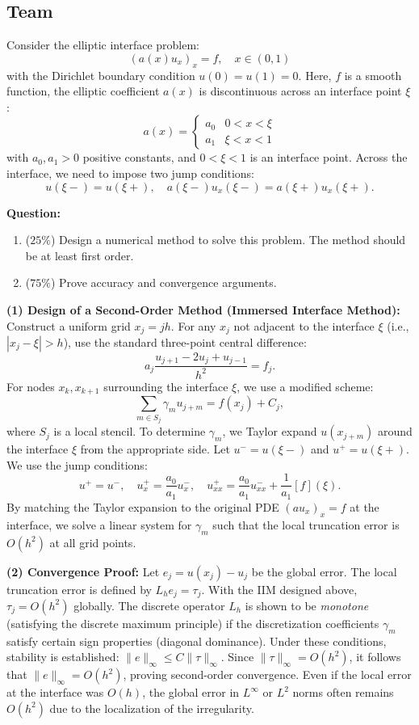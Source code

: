 \subsection{Team}

\begin{exercise}
\label{applied:2015:6}
Consider the elliptic interface problem:
\[
(a(x)u_{x})_{x}=f,\quad x\in(0,1)
\]
with the Dirichlet boundary condition $u(0) = u(1) = 0$. Here, $f$ is a smooth function, the elliptic coefficient $a(x)$ is discontinuous across an interface point $\xi$:
\[
a(x)=\begin{cases}a_{0}&0<x<\xi\\ a_{1}&\xi<x<1\end{cases}
\]
with $a_{0},a_{1}>0$ positive constants, and $0<\xi<1$ is an interface point. Across the interface, we need to impose two jump conditions:
\[
u(\xi-)=u(\xi+),\quad a(\xi-)u_{x}(\xi-)=a(\xi+)u_{x}(\xi+).
\]

\textbf{Question:}
\begin{enumerate}
\item[(1)] ($25\%$) Design a numerical method to solve this problem. The method should be at least first order.
\item[(2)] ($75\%$) Prove accuracy and convergence arguments.
\end{enumerate}
\end{exercise}

\begin{solution}
\textbf{(1) Design of a Second-Order Method (Immersed Interface Method):}
Construct a uniform grid $x_j = jh$. For any $x_j$ not adjacent to the interface $\xi$ (i.e., $|x_j - \xi| > h$), use the standard three-point central difference:
\[
a_j \frac{u_{j+1} - 2u_j + u_{j-1}}{h^2} = f_j.
\]
For nodes $x_k, x_{k+1}$ surrounding the interface $\xi$, we use a modified scheme:
\[
\sum_{m \in S_j} \gamma_m u_{j+m} = f(x_j) + C_j,
\]
where $S_j$ is a local stencil. To determine $\gamma_m$, we Taylor expand $u(x_{j+m})$ around the interface $\xi$ from the appropriate side. Let $u^- = u(\xi-)$ and $u^+ = u(\xi+)$. We use the jump conditions:
\[
u^+ = u^-, \quad u_x^+ = \frac{a_0}{a_1} u_x^-, \quad u_{xx}^+ = \frac{a_0}{a_1} u_{xx}^- + \frac{1}{a_1}[f](\xi).
\]
By matching the Taylor expansion to the original PDE $(au_x)_x = f$ at the interface, we solve a linear system for $\gamma_m$ such that the local truncation error is $O(h^2)$ at all grid points.

\textbf{(2) Convergence Proof:}
Let $e_j = u(x_j) - u_j$ be the global error. The local truncation error is defined by $L_h e_j = \tau_j$. With the IIM designed above, $\tau_j = O(h^2)$ globally.
The discrete operator $L_h$ is shown to be \textit{monotone} (satisfying the discrete maximum principle) if the discretization coefficients $\gamma_m$ satisfy certain sign properties (diagonal dominance).
Under these conditions, stability is established: $\|e\|_\infty \leq C \|\tau\|_\infty$.
Since $\|\tau\|_\infty = O(h^2)$, it follows that $\|e\|_\infty = O(h^2)$, proving second-order convergence. Even if the local error at the interface was $O(h)$, the global error in $L^\infty$ or $L^2$ norms often remains $O(h^2)$ due to the localization of the irregularity.
\end{solution}

